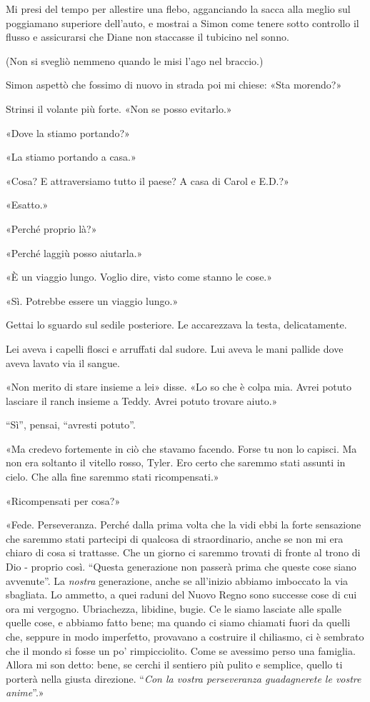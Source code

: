 Mi presi del tempo per allestire una flebo, agganciando la sacca alla
meglio sul poggiamano superiore dell'auto, e mostrai a Simon come tenere
sotto controllo il flusso e assicurarsi che Diane non staccasse il
tubicino nel sonno.

(Non si svegliò nemmeno quando le misi l'ago nel braccio.)

Simon aspettò che fossimo di nuovo in strada poi mi chiese: «Sta
morendo?»

Strinsi il volante più forte. «Non se posso evitarlo.»

«Dove la stiamo portando?»

«La stiamo portando a casa.»

«Cosa? E attraversiamo tutto il paese? A casa di Carol e E.D.?»

«Esatto.»

«Perché proprio là?»

«Perché laggiù posso aiutarla.»

«È un viaggio lungo. Voglio dire, visto come stanno le cose.»

«Sì. Potrebbe essere un viaggio lungo.»

Gettai lo sguardo sul sedile posteriore. Le accarezzava la testa,
delicatamente.

Lei aveva i capelli flosci e arruffati dal sudore. Lui aveva le mani
pallide dove aveva lavato via il sangue.

«Non merito di stare insieme a lei» disse. «Lo so che è colpa mia. Avrei
potuto lasciare il ranch insieme a Teddy. Avrei potuto trovare aiuto.»

``Sì'', pensai, ``avresti potuto''.

«Ma credevo fortemente in ciò che stavamo facendo. Forse tu non lo
capisci. Ma non era soltanto il vitello rosso, Tyler. Ero certo che
saremmo stati assunti in cielo. Che alla fine saremmo stati
ricompensati.»

«Ricompensati per cosa?»

«Fede. Perseveranza. Perché dalla prima volta che la vidi ebbi la forte
sensazione che saremmo stati partecipi di qualcosa di straordinario,
anche se non mi era chiaro di cosa si trattasse. Che un giorno ci
saremmo trovati di fronte al trono di Dio - proprio così. ``Questa
generazione non passerà prima che queste cose siano avvenute''. La
\emph{nostra} generazione, anche se all'inizio abbiamo imboccato la via
sbagliata. Lo ammetto, a quei raduni del Nuovo Regno sono successe cose
di cui ora mi vergogno. Ubriachezza, libidine, bugie. Ce le siamo
lasciate alle spalle quelle cose, e abbiamo fatto bene; ma quando ci
siamo chiamati fuori da quelli che, seppure in modo imperfetto,
provavano a costruire il chiliasmo, ci è sembrato che il mondo si fosse
un po' rimpicciolito. Come se avessimo perso una famiglia. Allora mi son
detto: bene, se cerchi il sentiero più pulito e semplice, quello ti
porterà nella giusta direzione. ``\emph{Con la vostra perseveranza
	guadagnerete le vostre anime}''.»

